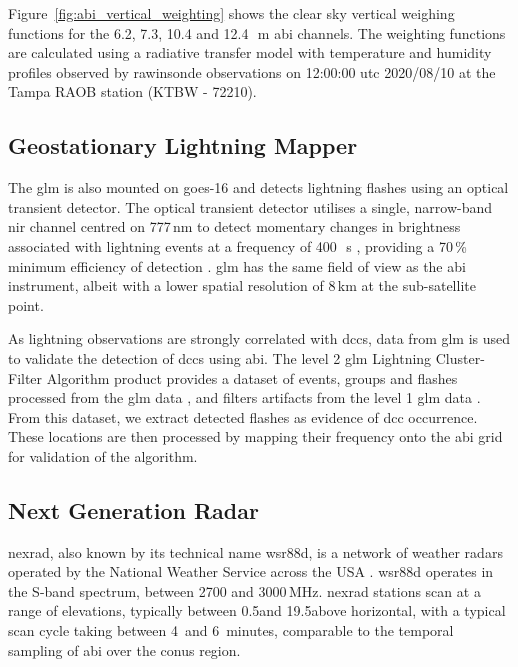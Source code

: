 Figure~\ref{fig:abi_vertical_weighting} shows the clear sky vertical weighing functions for the 6.2, 7.3, 10.4 and 12.4\,\unit{\mu m} \acrshort{abi} channels.
The weighting functions are calculated using a radiative transfer model with temperature and humidity profiles observed by rawinsonde observations on 12:00:00 \acrshort{utc} 2020/08/10 at the Tampa RAOB station (KTBW - 72210). 



\subsection{Geostationary Lightning Mapper}

The \acrshort{glm} is also mounted on \acrshort{goes}-16 and detects lightning flashes using an optical transient detector.
The optical transient detector utilises a single, narrow-band \acrshort{nir} channel centred on 777\,\unit{nm} \citep{orville_absolute_1984} to detect momentary changes in brightness associated with lightning events at a frequency of 400\,\unit{\mu s} \citep{christian_global_2003}, providing a 70\,\% minimum efficiency of detection \citep{goodman_goes-r_2013}.
\acrshort{glm} has the same field of view as the \acrshort{abi} instrument, albeit with a lower spatial resolution of 8\,\unit{km} at the sub-satellite point.

As lightning observations are strongly correlated with \acrshort{dcc}s, data from \acrshort{glm} is used to validate the detection of \acrshort{dcc}s using \acrshort{abi}.
The level 2 \acrshort{glm} Lightning Cluster-Filter Algorithm product provides a dataset of events, groups and flashes processed from the \acrshort{glm} data \citep{peterson_research_2019}, and filters artifacts from the level 1 \acrshort{glm} data \citep{peterson_removing_2020}.
From this dataset, we extract detected flashes as evidence of \acrshort{dcc} occurrence.
These locations are then processed by mapping their frequency onto the \acrshort{abi} grid for validation of the algorithm.

\subsection{Next Generation Radar}

\acrshort{nexrad}, also known by its technical name \acrshort{wsr88d}, is a network of weather radars operated by the National Weather Service across the USA \citep{crum_wsr-88d_1993}.
\acrshort{wsr88d} operates in the S-band spectrum, between 2700 and 3000\,\unit{MHz}.
\acrshort{nexrad} stations scan at a range of elevations, typically between 0.5\textdegree and 19.5\textdegree above horizontal, with a typical scan cycle taking between 4\, and 6~minutes, comparable to the temporal sampling of \acrshort{abi} over the \acrshort{conus} region.


